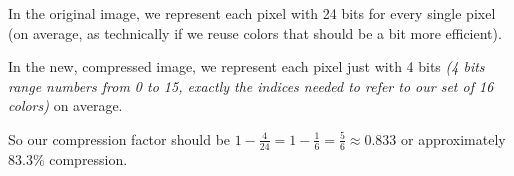 \begin{answer}
    
    In the original image, we represent each pixel with 24 bits for every single pixel (on average, as technically if we reuse colors that should be a bit more efficient).


    In the new, compressed image, we represent each pixel just with 4 bits \textit{(4 bits range numbers from 0 to 15, exactly the indices needed to refer to our set of 16 colors)} on average.


    So our compression factor should be $1 - \frac{4}{24} = 1 - \frac{1}{6} = \frac{5}{6} \approx 0.833$ or approximately 83.3\% compression.
\end{answer}
